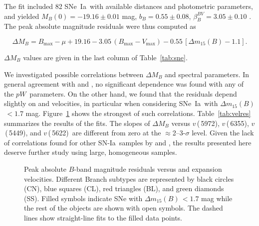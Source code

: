 \documentclass[apj]{emulateapj-rtx4}
\newcommand{\ew}{$pW$}
\newcommand{\vthree}{$v$\,(\ion{S}{2}\,5449)}
\newcommand{\vfour}{$v$\,(\ion{S}{2}\,5622)}
\newcommand{\vfive}{$v$\,(\ion{Si}{2}\,5972)}
\newcommand{\vsix}{$v$\,(\ion{Si}{2}\,6355)}
\newcommand{\dm}{$\Delta m_{15}(B)$}
\newcommand{\sndia}{SN-Ia}
\newcommand{\sneia}{SNe~Ia}
\begin{document}
\noindent The fit included 82 \sneia\ with available
distances and photometric parameters, and yielded
$M_B(0)=-19.16\pm0.01$ mag, $b_B=0.55\pm0.08$,
$\beta_B^{BV}=3.05\pm0.10$ \citep[cf. fit~1 of Table~8
  in][]{folatelli10}. The peak absolute magnitude residuals were
thus computed as

{\small 
\begin{equation}
\label{eq:hres}
\Delta M_B = B_{\mathrm{max}} - \mu + 19.16 - 3.05 \,
(B_{\mathrm{max}}-V_{\mathrm{max}}) - 0.55 \, [\Delta m_{15}(B) - 1.1].
\end{equation}
}

\noindent $\Delta M_B$ values are given in the last column of
Table~\ref{tab:sne}. 

We investigated possible correlations between $\Delta M_B$ and
spectral parameters. In general agreement with \citet{blondin11a}
  and \citet{silverman12c}, no significant dependence was found with any of
the \ew\ parameters. On the other hand, we found that the residuals
depend slightly on  and  velocities, in
particular when considering \sneia\ with \dm\,$<1.7$
mag. Figure~\ref{fig:vel256res} shows the strongest of such correlations.
Table~\ref{tab:velres} summarizes the 
results of the fits. The slopes of $\Delta M_B$ versus
\vfive, \vsix, \vthree, and \vfour\ are different from zero at the
$\approx$2--3-$\sigma$ level. Given the lack of correlations
  found for other \sndia\ samples by \citet{blondin11a} and
  \citet{silverman12c}, the results presented here deserve further
  study using large, homogeneous samples.

\begin{figure}[htpb]%
\caption{Peak absolute $B$-band magnitude residuals versus 
   and  expansion velocities. Different Branch
  subtypes are represented by black circles (CN), blue squares (CL),
  red triangles (BL), and green diamonds (SS). Filled symbols indicate
  SNe with \dm\,$<1.7$ mag while the rest of the objects are shown with open
  symbols. The dashed lines show straight-line fits to the filled data
  points. \label{fig:vel256res}}    
\end{figure}
\end{document}
